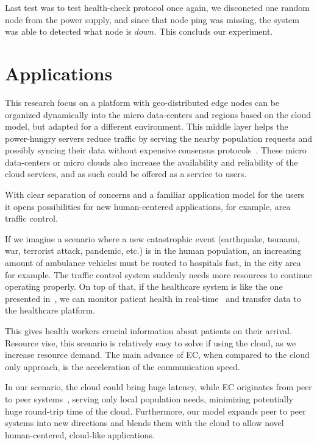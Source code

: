 Last test was to test health-check protocol once again, we disconeted one random node from the power supply, and since that node ping was missing, the system was able to detected what node is $down$. This concluds our experiment.
%
%
\section{Applications}\label{sec:app}
%
This research focus on a platform with geo-distributed edge nodes can be organized dynamically into the micro data-centers and regions based on the cloud model, but adapted for a different environment. This middle layer helps the power-hungry servers reduce traffic by serving the nearby population requests and possibly syncing their data without expensive consensus protocols~\cite{inproceedingsSimic2}. These micro data-centers or micro clouds also increase the availability and reliability of the cloud services, and as such could be offered as a service to users.

With clear separation of concerns and a familiar application model for the users it opens possibilities for new human-centered applications, for example, area traffic control. 

If we imagine a scenario where a new catastrophic event (earthquake, tsunami, war, terrorist attack, pandemic, etc.) is in the human population, an increasing amount of ambulance vehicles must be routed to hospitals fast, in the city area for example. The traffic control system suddenly needs more resources to continue operating properly. On top of that, if the healthcare system is like the one presented in~\cite{OmarBBKR19, inproceedingsSimic5}, we can monitor patient health in real-time~\cite{Al-KhafajiyBCAK19} and transfer data to the healthcare platform. 

This gives health workers crucial information about patients on their arrival. Resource vise, this scenario is relatively easy to solve if using the cloud, as we increase resource demand. The main advance of EC, when compared to the cloud only approach, is the acceleration of the communication speed. 

In our scenario, the cloud could bring huge latency, while EC originates from peer to peer systems~\cite{LopezMEDHIBFR15}, serving only local population needs, minimizing potentially huge round-trip time of the cloud. Furthermore, our model expands peer to peer systems into new directions and blends them with the cloud to allow novel human-centered, cloud-like applications. 

